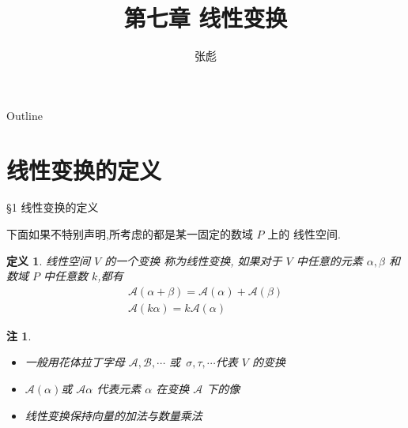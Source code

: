 \documentclass[13pt]{beamer}
\newtheorem*{defi}{定义}
\newtheorem*{rem}{注}
\def\A{\mathscr{A}}
\def\a{\alpha}
\begin{document}
\title[]{第七章 \quad  线性变换}
\author[]{{\large 张彪}\\  }

\date{}


\AtBeginSection[]
{
\setcounter{exa}{0}
\setcounter{equation}{0}
}


\begin{frame}
\maketitle
\end{frame}

\begin{frame}{Outline}
	\tableofcontents
\end{frame}

\section{线性变换的定义}
\begin{frame}{\S 1  线性变换的定义}

%
%


下面如果不特别声明,所考虑的都是某一固定的数域 $P$ 上的
线性空间.

\begin{defi}
线性空间 $V$ 的一个变换 称为线性变换, 如果对于 $V$ 中任意的元素 ${\alpha}, {\beta}$ 和数域 $P$ 中任意数 $k$,都有
\[
\begin{array}{c}
\mathscr{A}({\alpha}+{\beta})=\mathscr{A}({\alpha})+\mathscr{A}({\beta}) \\
\mathscr{A}({k} {\alpha})=k \mathscr{A}({\alpha})
\end{array}
\]
\end{defi}

\begin{rem}
\begin{itemize}
\item 一般用花体拉丁字母 $\mathscr{A}, \mathscr{B}, \cdots$ 或 $\sigma,\tau, \cdots$代表 $V$ 的变换
\item $\mathscr{A}({\alpha})$或 $\A \a$ 代表元素 ${\alpha}$ 在变换 $\A$ 下的像
\item 线性变换保持向量的加法与数量乘法
\end{itemize}
\end{rem}
\end{frame}
\end{document}
